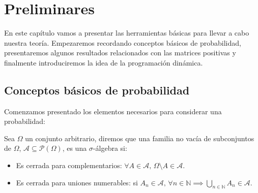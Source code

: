 \chapter{Preliminares}

En este capítulo vamos a presentar las herramientas básicas para llevar a cabo nuestra teoría. Empezaremos recordando conceptos básicos de probabilidad, presentaremos algunos resultados relacionados con las matrices positivas y finalmente introduciremos la idea de la programación dinámica.

\section{Conceptos básicos de probabilidad}
Comenzamos presentado los elementos necesarios para considerar una probabilidad:
\begin{definition}
    Sea $\Omega$ un conjunto arbitrario, diremos que una familia no vacía de subconjuntos de $\Omega$, $\mathcal{A}\subseteq\mathcal{P}(\Omega)$, es una $\sigma$-álgebra si:
    \begin{itemize}
        \item Es cerrada para complementarios: $\forall A\in\mathcal{A},\, \Omega\setminus A\in\mathcal{A}.$
        \item Es cerrada para uniones numerables: si $A_{n}\in\mathcal{A}, \,\forall n\in\mathbb{N}  \implies \displaystyle\bigcup_{n\in\mathbb{N}}A_n\in\mathcal{A}.$
    \end{itemize}
\end{definition}

